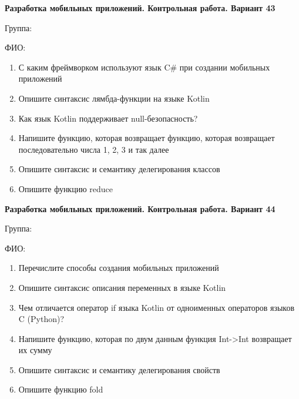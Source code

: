\documentclass[12pt]{article}
\begin{document}
\newpage\begin{minipage}{\textwidth}
\textbf{Разработка мобильных приложений. Контрольная работа. Вариант 43}

Группа: \underline{\hspace{3cm}}

ФИО: \underline{\hspace{10cm}}

\begin{enumerate}
\item С каким фреймворком используют язык C\# при создании мобильных приложений
\item Опишите синтаксис лямбда-функции на языке Kotlin
\item Как язык Kotlin поддерживает null-безопасность?
\item Напишите функцию, которая возвращает функцию, которая возвращает последовательно числа 1, 2, 3 и так далее
\item Опишите синтаксис и семантику делегирования классов
\item Опишите функцию reduce

\end{enumerate}
\end{minipage}

\newpage\begin{minipage}{\textwidth}
\textbf{Разработка мобильных приложений. Контрольная работа. Вариант 44}

Группа: \underline{\hspace{3cm}}

ФИО: \underline{\hspace{10cm}}

\begin{enumerate}
\item Перечислите способы создания мобильных приложений
\item Опишите синтаксис описания переменных в языке Kotlin
\item Чем отличается оператор if языка Kotlin от одноименных операторов языков C (Python)?
\item Напишите функцию, которая по двум данным функция Int->Int возвращает их сумму
\item Опишите синтаксис и семантику делегирования свойств
\item Опишите функцию fold

\end{enumerate}
\end{minipage}
\end{document}
